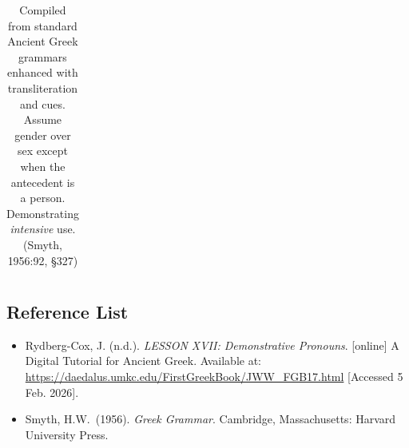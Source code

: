 \documentclass[10pt,a4paper,notitlepage]{article}
\begin{document}
\begin{table}[H]
\begin{tabular}{c|ccc|c}
        \end{tabular}
         \caption{Compiled from standard Ancient Greek grammars enhanced with transliteration and cues.
            Assume gender over sex except when the antecedent is a person. Demonstrating \emph{intensive} use.
             (Smyth, 1956:92, \S327)}
     \end{table}

    \subsection*{Reference List}
    \begin{itemize}[label={}, leftmargin=0]
        \item Rydberg-Cox, J. (n.d.). \textit{LESSON XVII: Demonstrative Pronouns}. [online] A Digital Tutorial for Ancient Greek. Available at: \url{https://daedalus.umkc.edu/FirstGreekBook/JWW_FGB17.html} [Accessed 5 Feb. 2026].
        \item Smyth, H.W.\ (1956). \textit{Greek Grammar}. Cambridge, Massachusetts: Harvard University Press.
    \end{itemize}
\end{document}
